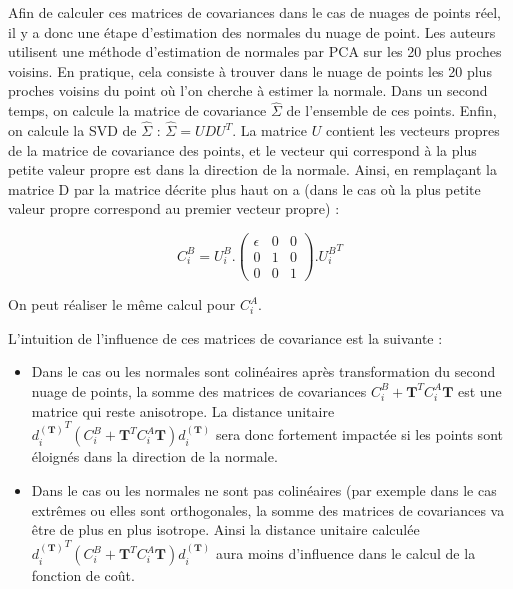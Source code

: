 Afin de calculer ces matrices de covariances dans le cas de nuages de points réel, il y a donc une étape d'estimation des normales du nuage de point. Les auteurs utilisent une méthode d'estimation de normales par PCA sur les 20 plus proches voisins. En pratique, cela consiste à trouver dans le nuage de points les 20 plus proches voisins du point où l'on cherche à estimer la normale. Dans un second temps, on calcule la matrice de covariance $\hat{\Sigma}$ de l'ensemble de ces points. Enfin, on calcule la SVD de $\hat{\Sigma}$ : $\hat{\Sigma} = UDU^{T}$. La matrice $U$ contient les vecteurs propres de la matrice de covariance des points, et le vecteur qui correspond à la plus petite valeur propre est dans la direction de la normale. Ainsi, en remplaçant la matrice D par la matrice décrite plus haut on a (dans le cas où la plus petite valeur propre correspond au premier vecteur propre) :

\begin{equation}
C_{i}^B = U_{i}^B.\begin{pmatrix} 
 \epsilon & 0 & 0 \\
 0 & 1 & 0 \\ 
 0 & 0 & 1 
 \end{pmatrix}.{U_{i}^{B}}^T
\end{equation}

On peut réaliser le même calcul pour $C_{i}^A$.

L'intuition de l'influence de ces matrices de covariance est la suivante :\\

\begin{itemize}
\item{Dans le cas ou les normales sont colinéaires après transformation du second nuage de points, la somme des matrices de covariances $C_{i}^B + \mathbf{T}^{T}C_{i}^{A}\mathbf{T}$ est une matrice qui reste anisotrope. La distance unitaire ${d_{i}^{(\mathbf{T})}}^{T}(C_{i}^B + \mathbf{T}^{T}C_{i}^{A}\mathbf{T})d_{i}^{(\mathbf{T})}$ sera donc fortement impactée si les points sont éloignés dans la direction de la normale.  
}

\item{Dans le cas ou les normales ne sont pas colinéaires (par exemple dans le cas extrêmes ou elles sont orthogonales}, la somme des matrices de covariances va être de plus en plus isotrope. Ainsi la distance unitaire calculée ${d_{i}^{(\mathbf{T})}}^{T}(C_{i}^B + \mathbf{T}^{T}C_{i}^{A}\mathbf{T})d_{i}^{(\mathbf{T})}$ aura moins d'influence dans le calcul de la fonction de coût.
\end{itemize}

